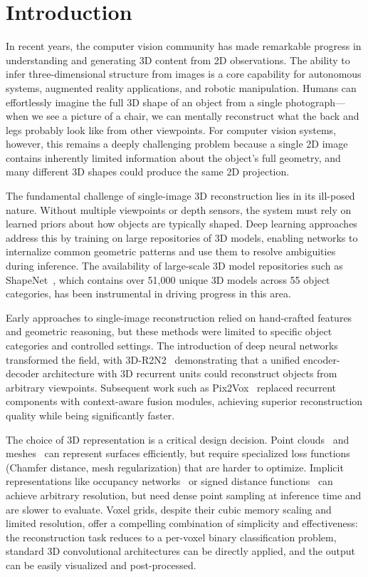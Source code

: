\documentclass[10pt,twocolumn,letterpaper]{article}
\begin{document}
\section{Introduction}
\label{sec:intro}

In recent years, the computer vision community has made remarkable progress in understanding and generating 3D content from 2D observations. The ability to infer three-dimensional structure from images is a core capability for autonomous systems, augmented reality applications, and robotic manipulation. Humans can effortlessly imagine the full 3D shape of an object from a single photograph---when we see a picture of a chair, we can mentally reconstruct what the back and legs probably look like from other viewpoints. For computer vision systems, however, this remains a deeply challenging problem because a single 2D image contains inherently limited information about the object's full geometry, and many different 3D shapes could produce the same 2D projection.

The fundamental challenge of single-image 3D reconstruction lies in its ill-posed nature. Without multiple viewpoints or depth sensors, the system must rely on learned priors about how objects are typically shaped. Deep learning approaches address this by training on large repositories of 3D models, enabling networks to internalize common geometric patterns and use them to resolve ambiguities during inference. The availability of large-scale 3D model repositories such as ShapeNet~\cite{chang2015shapenet}, which contains over 51,000 unique 3D models across 55 object categories, has been instrumental in driving progress in this area.

Early approaches to single-image reconstruction relied on hand-crafted features and geometric reasoning, but these methods were limited to specific object categories and controlled settings. The introduction of deep neural networks transformed the field, with 3D-R2N2~\cite{choy2016r2n2} demonstrating that a unified encoder-decoder architecture with 3D recurrent units could reconstruct objects from arbitrary viewpoints. Subsequent work such as Pix2Vox~\cite{xie2019pix2vox} replaced recurrent components with context-aware fusion modules, achieving superior reconstruction quality while being significantly faster.

The choice of 3D representation is a critical design decision. Point clouds~\cite{fan2017pointset} and meshes~\cite{wang2018pixel2mesh} can represent surfaces efficiently, but require specialized loss functions (Chamfer distance, mesh regularization) that are harder to optimize. Implicit representations like occupancy networks~\cite{mescheder2019occupancy} or signed distance functions~\cite{park2019deepsdf} can achieve arbitrary resolution, but need dense point sampling at inference time and are slower to evaluate. Voxel grids, despite their cubic memory scaling and limited resolution, offer a compelling combination of simplicity and effectiveness: the reconstruction task reduces to a per-voxel binary classification problem, standard 3D convolutional architectures can be directly applied, and the output can be easily visualized and post-processed.
\end{document}

